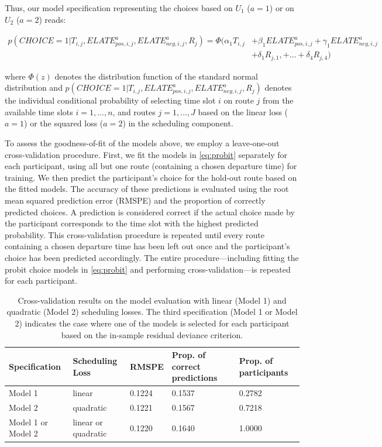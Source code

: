 \documentclass[preprint, 3p, authoryear]{elsarticle} %
\theoremstyle{definition}
\theoremstyle{definition}
\theoremstyle{definition}
\theoremstyle{definition}
\theoremstyle{remark}
\begin{document}
Thus, our model specification representing the choices based on \(U_1\) (\(a=1\)) or on \(U_2\) (\(a=2\)) reads:

\begin{align}p(CHOICE=1|T_{i,j},ELATE^a_{pos,i,j}, ELATE^a_{neg,i,j}, R_j) = \Phi(\alpha_{1} T_{i,j} &+ \beta_{1} ELATE^a_{pos,i,j} + \gamma_1ELATE^a_{neg,i,j}\nonumber\\
&+ \delta_1R_{j,1},+ \ldots +\delta_4R_{j,4}) \label{eq:probit} \end{align}

where \(\Phi(z)\) denotes the distribution function of the standard normal distribution and \(p(CHOICE=1|T_{i,j},ELATE^a_{pos,i,j}, ELATE^a_{neg,i,j}, R_j)\) denotes the individual conditional probability of selecting time slot \(i\) on route \(j\) from the available time slots \(i=1, \ldots,n\), and routes \(j=1,\ldots,J\) based on the linear loss (\(a=1\)) or the squared loss (\(a=2\)) in the scheduling component.

To assess the goodness-of-fit of the models above, we employ a leave-one-out cross-validation procedure. First, we fit the models in \eqref{eq:probit} separately for each participant, using all but one route (containing a chosen departure time) for training. We then predict the participant's choice for the hold-out route based on the fitted models. The accuracy of these predictions is evaluated using the root mean squared prediction error (RMSPE) and the proportion of correctly predicted choices. A prediction is considered correct if the actual choice made by the participant corresponds to the time slot with the highest predicted probability. This cross-validation procedure is repeated until every route containing a chosen departure time has been left out once and the participant's choice has been predicted accordingly. The entire procedure---including fitting the probit choice models in \eqref{eq:probit} and performing cross-validation---is repeated for each participant.

\begin{table}
\centering
\caption{\label{tab:tableprobit}Cross-validation results on the model evaluation with linear (Model 1) and quadratic (Model 2) scheduling losses. The third specification (Model 1 or Model 2) indicates the case where one of the models is selected for each participant based on the in-sample residual deviance criterion.}
\centering
\begin{tabular}[t]{l|l|l|l|l}
\hline
Specification & Scheduling Loss & RMSPE & Prop. of correct predictions & Prop. of participants\\
\hline
Model 1 & linear & 0.1224 & 0.1537 & 0.2782\\
\hline
Model 2 & quadratic & 0.1221 & 0.1567 & 0.7218\\
\hline
Model 1 or Model 2 & linear or quadratic & 0.1220 & 0.1640 & 1.0000\\
\hline
\end{tabular}
\end{table}
\end{document}
